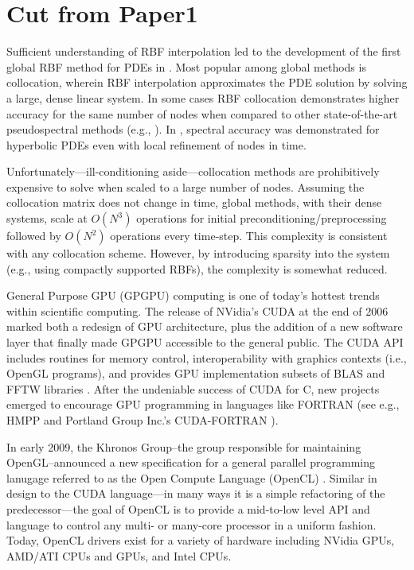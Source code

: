 \section{Cut from Paper1}



Sufficient understanding of RBF interpolation led to the development of the first global RBF method for PDEs in \cite{Kansa1990a}. Most popular among global methods is collocation, wherein RBF interpolation approximates the PDE solution by solving a large, dense linear system. 
In some cases RBF collocation demonstrates higher accuracy for the same number of nodes when compared to other state-of-the-art pseudospectral methods (e.g., \cite{Larsson2003} \cite{Flyer2007} \cite{Flyer2009b}). In \cite{Flyer2010}, spectral accuracy was demonstrated for hyperbolic PDEs even with local refinement of nodes in time.


Unfortunately---ill-conditioning aside---collocation methods are prohibitively expensive to solve when scaled to a large number of nodes. Assuming the collocation matrix does not change in time, global methods, with their dense systems, scale at $O(N^3)$ operations for initial preconditioning/preprocessing followed by $O(N^2)$ operations every time-step. This complexity is consistent with any collocation scheme. However, by introducing sparsity into the system (e.g., using compactly supported RBFs), the complexity is somewhat reduced.



General Purpose GPU (GPGPU) computing is one of today's hottest trends within scientific computing. 
The release of NVidia's CUDA at the end of 2006 marked both a 
redesign of GPU architecture, plus the addition of a new software layer that finally made GPGPU accessible to the general public. The CUDA API includes routines for memory control, interoperability with graphics contexts (i.e., 
OpenGL programs), and provides GPU implementation subsets of BLAS and FFTW libraries \cite{CudaGuide2011}. After the undeniable success of CUDA for C, new projects emerged to encourage GPU programming in languages like FORTRAN (see e.g., HMPP \cite{HMPP2009} and Portland Group Inc.'s CUDA-FORTRAN \cite{CudaFortran2009}). 

In early 2009, the Khronos Group--the group responsible for maintaining OpenGL--announced a new specification for a general 
parallel programming lanugage referred to as the Open Compute Language (OpenCL) \cite{OpenCL2009}. Similar in design to the CUDA language---in many ways it is a simple refactoring of the predecessor---the goal of OpenCL is to provide a mid-to-low level API and language to control any multi- or many-core processor in a uniform fashion. Today, OpenCL drivers exist for a variety of hardware including NVidia GPUs, AMD/ATI CPUs and GPUs, and Intel CPUs. 

